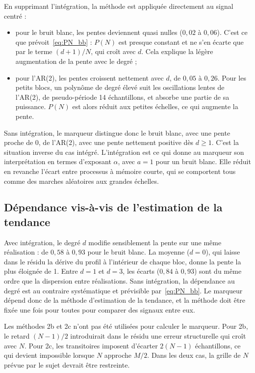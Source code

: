 \documentclass[11pt,a4paper]{article}
\begin{document}
En supprimant l'intégration, la méthode est appliquée directement au signal centré :
\begin{itemize}
  \item pour le bruit blanc, les pentes deviennent quasi nulles ($0{,}02$ à $0{,}06$). C'est ce que prévoit~\eqref{eq:PN_bb} : $P(N)$ est presque constant et ne s'en écarte que par le terme $(d+1)/N$, qui croît avec $d$. Cela explique la légère augmentation de la pente avec le degré ;
  \item pour l'AR(2), les pentes croissent nettement avec $d$, de $0{,}05$ à $0{,}26$. Pour les petits blocs, un polynôme de degré élevé suit les oscillations lentes de l'AR(2), de pseudo-période 14 échantillons, et absorbe une partie de sa puissance. $P(N)$ est alors réduit aux petites échelles, ce qui augmente la pente.
\end{itemize}
Sans intégration, le marqueur distingue donc le bruit blanc, avec une pente proche de 0, de l'AR(2), avec une pente nettement positive dès $d \geq 1$. C'est la situation inverse du cas intégré. L'intégration est ce qui donne au marqueur son interprétation en termes d'exposant $\alpha$, avec $a = 1$ pour un bruit blanc. Elle réduit en revanche l'écart entre processus à mémoire courte, qui se comportent tous comme des marches aléatoires aux grandes échelles.

\subsection{Dépendance vis-à-vis de l'estimation de la tendance}

Avec intégration, le degré $d$ modifie sensiblement la pente sur une même réalisation : de $0{,}58$ à $0{,}93$ pour le bruit blanc. La moyenne ($d = 0$), qui laisse dans le résidu la dérive du profil à l'intérieur de chaque bloc, donne la pente la plus éloignée de 1. Entre $d = 1$ et $d = 3$, les écarts ($0{,}84$ à $0{,}93$) sont du même ordre que la dispersion entre réalisations. Sans intégration, la dépendance au degré est au contraire systématique et prévisible par~\eqref{eq:PN_bb}. Le marqueur dépend donc de la méthode d'estimation de la tendance, et la méthode doit être fixée une fois pour toutes pour comparer des signaux entre eux.

Les méthodes 2b et 2c n'ont pas été utilisées pour calculer le marqueur. Pour 2b, le retard $(N-1)/2$ introduirait dans le résidu une erreur structurelle qui croît avec $N$. Pour 2c, les transitoires imposent d'écarter $2(N-1)$ échantillons, ce qui devient impossible lorsque $N$ approche $M/2$. Dans les deux cas, la grille de $N$ prévue par le sujet devrait être restreinte.
\end{document}
